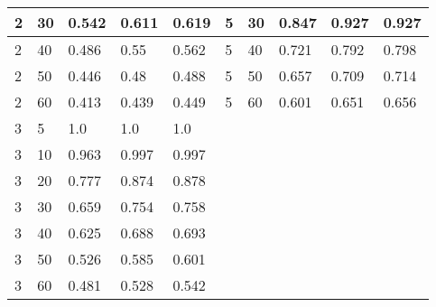 \begin{table}[H]
\begin{tabular}{|l|l|l|l|l|lllll}
2  & 30 & 0.542 & 0.611 & 0.619 & \multicolumn{1}{l|}{5}  & \multicolumn{1}{l|}{30} & \multicolumn{1}{l|}{0.847} & \multicolumn{1}{l|}{0.927} & \multicolumn{1}{l|}{0.927} \\ \hline
2  & 40 & 0.486 & 0.55  & 0.562 & \multicolumn{1}{l|}{5}  & \multicolumn{1}{l|}{40} & \multicolumn{1}{l|}{0.721} & \multicolumn{1}{l|}{0.792} & \multicolumn{1}{l|}{0.798} \\ \hline
2  & 50 & 0.446 & 0.48  & 0.488 & \multicolumn{1}{l|}{5}  & \multicolumn{1}{l|}{50} & \multicolumn{1}{l|}{0.657} & \multicolumn{1}{l|}{0.709} & \multicolumn{1}{l|}{0.714} \\ \hline
2  & 60 & 0.413 & 0.439 & 0.449 & \multicolumn{1}{l|}{5}  & \multicolumn{1}{l|}{60} & \multicolumn{1}{l|}{0.601} & \multicolumn{1}{l|}{0.651} & \multicolumn{1}{l|}{0.656} \\ \hline
3  & 5  & 1.0   & 1.0   & 1.0   &                         &                         &                            &                            &                            \\ \cline{1-5}
3  & 10 & 0.963 & 0.997 & 0.997 &                         &                         &                            &                            &                            \\ \cline{1-5}
3  & 20 & 0.777 & 0.874 & 0.878 &                         &                         &                            &                            &                            \\ \cline{1-5}
3  & 30 & 0.659 & 0.754 & 0.758 &                         &                         &                            &                            &                            \\ \cline{1-5}
3  & 40 & 0.625 & 0.688 & 0.693 &                         &                         &                            &                            &                            \\ \cline{1-5}
3  & 50 & 0.526 & 0.585 & 0.601 &                         &                         &                            &                            &                            \\ \cline{1-5}
3  & 60 & 0.481 & 0.528 & 0.542 &                         &                         &                            &                            &                            \\ \cline{1-5}
\end{tabular}
\end{table}
